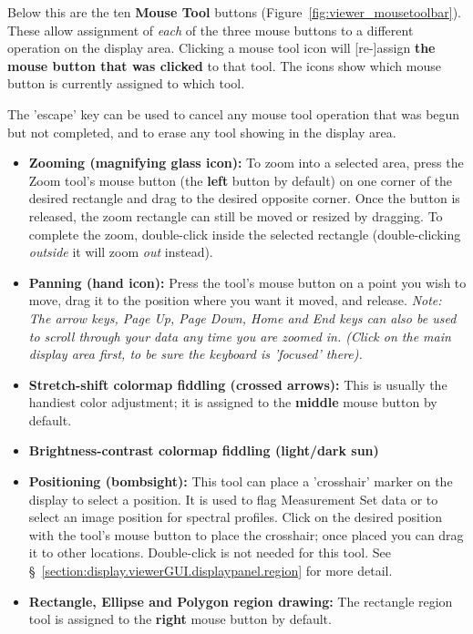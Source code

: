 Below this are the ten {\bf Mouse Tool} buttons
(Figure~\ref{fig:viewer_mousetoolbar}). These allow assignment of
{\it each} of the three mouse buttons to a different operation on the display
area. Clicking a mouse tool icon will [re-]assign {\bf the mouse button that
was clicked} to that tool.  The icons show which mouse button is currently
assigned to which tool.  

The 'escape' key can be used to cancel any mouse tool operation that was
begun but not completed, and to erase any tool showing in the display area.
\begin{itemize}
   \item {\bf Zooming (magnifying glass icon):}
     To zoom into a selected area, press the Zoom tool's mouse button
     (the {\bf left} button by default) on one corner of the desired
     rectangle and drag to the desired opposite corner. Once the button is
     released, the zoom rectangle can still be moved or resized by dragging.
     To complete the zoom, double-click inside the selected rectangle
     (double-clicking {\it outside} it will zoom {\it out} instead).
   \item {\bf Panning (hand icon):} Press the tool's mouse button on a 
     point you wish to move, drag it to the position where you want it
     moved, and release. {\it Note: The arrow keys, Page Up, Page Down,
     Home and End keys can also be used to scroll through your data any time
     you are zoomed in. (Click on the main display area first, to be sure
     the keyboard is 'focused' there).}
   \item {\bf Stretch-shift colormap fiddling (crossed arrows):} This is
     usually the handiest color adjustment; it is assigned to the {\bf middle}
     mouse button by default.
   \item {\bf Brightness-contrast colormap fiddling (light/dark sun)} 
   \item {\bf Positioning (bombsight):} This tool can place a 'crosshair'
     marker on the display to select a position. It is used to flag
     Measurement Set data or to select an image position for spectral profiles.
     Click on the desired position with the tool's mouse button to place
     the crosshair; once placed you can drag it to other locations.
     Double-click is not needed for this tool.  
     See \S~\ref{section:display.viewerGUI.displaypanel.region} for more
     detail.
   \item {\bf Rectangle, Ellipse and Polygon region drawing:} The rectangle
     region tool is assigned to the {\bf right} mouse button by default.

\end{itemize}
